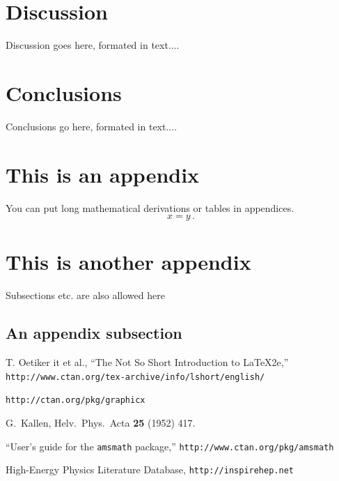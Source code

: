 \documentclass[a4paper,12pt]{article}
\begin{document}
\section{Discussion}
\setcounter{equation}{0}

Discussion goes here, formated in text....


\section{Conclusions}
\setcounter{equation}{0}

Conclusions go here, formated in text....

\appendix

\section{This is an appendix}
\setcounter{equation}{0}

You can put long mathematical derivations or tables in appendices.
\begin{equation}
\label{appendixequation}
x = y\,.
\end{equation}

\section{This is another appendix}
\setcounter{equation}{0}

Subsections etc. are also allowed here

\subsection{An appendix subsection}


\begin{thebibliography}{99}
T. Oetiker {it et al.}, ``The Not So Short Introduction to \LaTeX2e,''
{\tt http://www.ctan.org/tex-archive/info/lshort/english/}

{\tt http://ctan.org/pkg/graphicx}

G.~Kallen,
Helv.\ Phys.\ Acta {\bf 25} (1952) 417.

``User's guide for the {\tt amsmath} package,''
{\tt http://www.ctan.org/pkg/amsmath}

 High-Energy Physics Literature Database,
{\tt http://inspirehep.net}

\end{thebibliography}
\end{document}
